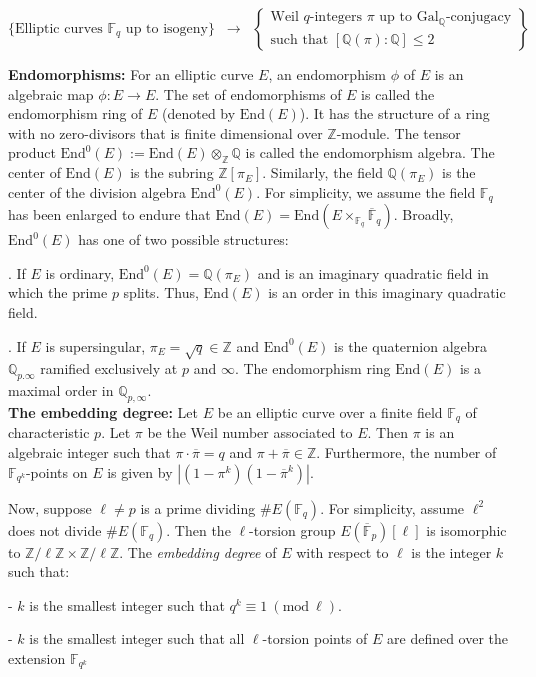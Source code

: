 \documentclass[11pt, lettersize, notitlepage, leqno, footskip=0.6cm]{article}
\newcommand{\bz}{\mathbb Z}
\newcommand{\bq}{\mathbb Q}
\newcommand{\bFP}{\ov{\mathbb{F}}_p}
\newcommand{\bFq}{\mathbb{F}_q}
\newcommand{\bFqk}{\mathbb{F}_{q^k}}
\newcommand{\bFQ}{\ov{\mathbb{F}}_q}
\newcommand{\absq}{\mathrm{Gal}_{\bq}}
\newcommand{\lra}{\longrightarrow}
\newcommand{\mr}{\mathrm}
\newcommand{\ov}{\overline}
\newcommand{\noin}{\noindent}
\newcommand{\Mod}[1]{\ (\mathrm{mod}\ #1)}
\newcommand{\End}{\mr{End}}
\numberwithin{equation}{section}
\begin{document}
\[
  \{ \text{Elliptic curves } \bFq \text{ up to isogeny}  \} \;\;\lra\;\; \left\{\begin{array}{l}
    \text{Weil } q\text{-integers } \pi \text{ up to } \absq\text{-conjugacy}\\ 
    \text{such that } [\bq(\pi):\bq]\leq 2
  \end{array}\right\}
\]


\noin \textbf{Endomorphisms:} For an elliptic curve $E$, an endomorphism $\phi$ of $E$ is an algebraic map $\phi:E\lra E$. The set of endomorphisms of $E$ is called the endomorphism ring of $E$ (denoted by $\End(E)$). It has the structure of a ring with no zero-divisors that is finite dimensional over $\bz$-module. The tensor product $\End^0(E):= \End(E)\otimes_{\bz}\bq$ is called the endomorphism algebra. The center of $\End(E)$ is the subring $\bz[\pi_E]$. Similarly, the field $\bq(\pi_E)$ is the center of the division algebra $\End^0(E)$. For simplicity, we assume the field $\bFq$ has been enlarged to endure that $\End(E) = \End(E\times_{\bFq} \bFQ)$. Broadly, $\End^0(E)$ has one of two possible structures:

\noin 1. If $E$ is ordinary, $\End^0(E) = \bq(\pi_E)$ and is an imaginary quadratic field in which the prime $p$ splits. Thus, $\End(E)$ is an order in this imaginary quadratic field.

\noin 2. If $E$ is supersingular, $\pi_E = \sqrt{q} \in \bz$ and $\End^0(E)$ is the quaternion algebra $\bq_{p.\infty}$ ramified exclusively at $p$ and $\infty$. The endomorphism ring $\End(E)$ is a maximal order in $\bq_{p,\infty}$.\\

\noin \textbf{The embedding degree:} Let $E$ be an elliptic curve over a finite field $\bFq$  of characteristic $p$. Let $\pi$ be the Weil number associated to $E$. Then $\pi$ is an algebraic integer such that $\pi\cdot \ov{\pi} = q$ and $\pi+\ov{\pi}\in \bz$. Furthermore, the number of $\bFqk$-points on $E$ is given by $|(1-\pi^k)(1-\ov{\pi}^k)|$.


Now, suppose $\ell\neq p$ is a prime dividing $\# E(\bFq)$. For simplicity, assume $\ell^2$ does not divide $\# E(\bFq)$. Then the $\ell$-torsion group $E(\bFP)[\ell]$ is isomorphic to $\bz/\ell\bz \times \bz/\ell\bz$. The \textit{embedding degree} of $E$ with respect to $\ell$ is the integer $k$ such that:

\noin - $k$ is the smallest integer such that $q^k\equiv 1\Mod{\ell}$.

\noin - $k$ is the smallest integer such that all $\ell$-torsion points of $E$ are defined over the extension $\bFqk$
\end{document}
